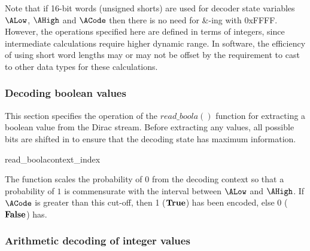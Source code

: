\begin{informative}
Note that if 16-bit words (unsigned shorts) are used for decoder state variables $\ALow$,
 $\AHigh$ and $\ACode$ then there is no need for {\&}-ing with 0xFFFF. However, the 
operations specified here are defined in terms of integers, since intermediate calculations
 require higher dynamic range. In software, the efficiency of using short word lengths may
or may not be offset by the requirement to cast to other data types for these calculations.
\end{informative}

\subsubsection{Decoding boolean values}

\label{arithreadbool}

This section specifies the operation of the $read\_boola()$ function
for extracting a boolean value from the Dirac stream. Before extracting
any values, all possible bits are shifted in to ensure that the decoding
state has maximum information.

\begin{pseudo}{read\_boola}{context\_index}
\bsELSE
\bsEND
{}
\bsEND
{}
\end{pseudo}

\begin{informative}
The function scales the probability of $0$ from the decoding context
so that a probability of $1$ is commensurate with the interval between
 $\ALow$ and $\AHigh$. If $\ACode$ is greater than this cut-off, then 1 ($\text{\bf{True}}$) has
been encoded, else 0 ($\text{\bf{False}}$) has.
\end{informative}

\subsubsection{Arithmetic decoding of integer values}

